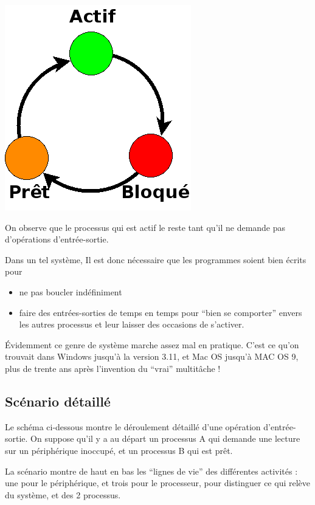 \begin{multicols}{2}
\begin{center}
\includegraphics[width=0.7\linewidth]{Figures/pret-actif-bloque2.png}
\end{center}

On observe que le processus qui est actif le reste tant
qu'il ne demande pas d'opérations d'entrée-sortie.

Dans un tel système, Il est donc nécessaire que les programmes soient bien écrits pour 
\begin{itemize}
\item ne pas boucler  indéfiniment
\item faire des entrées-sorties de temps en temps pour ``bien se comporter'' envers les autres processus et leur laisser des occasions de
  s'activer.
\end{itemize}

Évidemment ce genre de système marche assez mal en pratique. C'est ce
qu'on trouvait dans Windows jusqu'à la version 3.11, et Mac OS
jusqu'à MAC OS 9, plus de trente ans après l'invention du ``vrai''
multitâche !

\subsection{Scénario détaillé}

Le schéma ci-dessous montre le déroulement détaillé d'une opération  d'entrée-sortie.
On suppose qu'il y a au départ un processus A qui demande une lecture sur un
périphérique inoccupé, et un processus B qui est prêt.

La scénario montre de haut en bas les ``lignes de vie'' des différentes activités : 
une pour le périphérique, et trois pour le processeur, pour distinguer ce qui relève du système, et des 2 processus.


\end{multicols}
